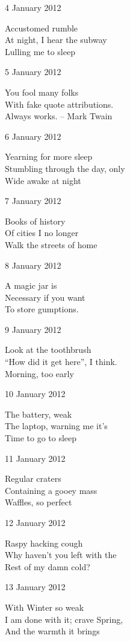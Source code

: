 \documentclass[12pt]{article}
\begin{document}
\newpage

4 January 2012

Accustomed rumble \\
At night, I hear the subway \\
Lulling me to sleep

5 January 2012

You fool many folks \\
With fake quote attributions. \\
Always works. -- Mark Twain

6 January 2012

Yearning for more sleep \\
Stumbling through the day, only \\
Wide awake at night

7 January 2012

Books of history \\
Of cities I no longer \\
Walk the streets of home

8 January 2012

A magic jar is \\
Necessary if you want \\
To store gumptions.

9 January 2012

Look at the toothbrush \\
``How did it get here'', I think. \\
Morning, too early

10 January 2012

The battery, weak \\
The laptop, warning me it's \\
Time to go to sleep


\newpage

11 January 2012

Regular craters \\
Containing a gooey mass \\
Waffles, so perfect

12 January 2012

Raspy hacking cough \\
Why haven't you left with the \\
Rest of my damn cold?

13 January 2012

With Winter so weak \\
I am done with it; crave Spring, \\
And the warmth it brings
\end{document}
